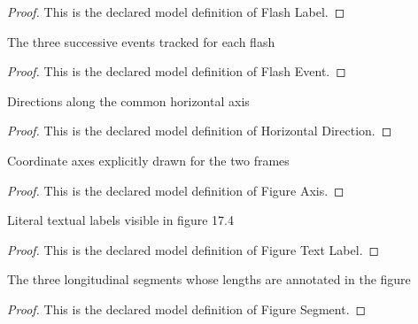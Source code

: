 \begin{proof}
  This is the declared model definition of Flash Label.
\end{proof}
\begin{definition}
  \label{def:physics:phyx-mini-0568:phyxminiproblems-problemphyxmini0568-flashevent}
  The three successive events tracked for each flash
\end{definition}
\begin{proof}
  This is the declared model definition of Flash Event.
\end{proof}
\begin{definition}
  \label{def:physics:phyx-mini-0568:phyxminiproblems-problemphyxmini0568-horizontaldirection}
  Directions along the common horizontal axis
\end{definition}
\begin{proof}
  This is the declared model definition of Horizontal Direction.
\end{proof}
\begin{definition}
  \label{def:physics:phyx-mini-0568:phyxminiproblems-problemphyxmini0568-figureaxis}
  Coordinate axes explicitly drawn for the two frames
\end{definition}
\begin{proof}
  This is the declared model definition of Figure Axis.
\end{proof}
\begin{definition}
  \label{def:physics:phyx-mini-0568:phyxminiproblems-problemphyxmini0568-figuretextlabel}
  Literal textual labels visible in figure 17.4
\end{definition}
\begin{proof}
  This is the declared model definition of Figure Text Label.
\end{proof}
\begin{definition}
  \label{def:physics:phyx-mini-0568:phyxminiproblems-problemphyxmini0568-figuresegment}
  The three longitudinal segments whose lengths are annotated in the figure
\end{definition}
\begin{proof}
  This is the declared model definition of Figure Segment.
\end{proof}
